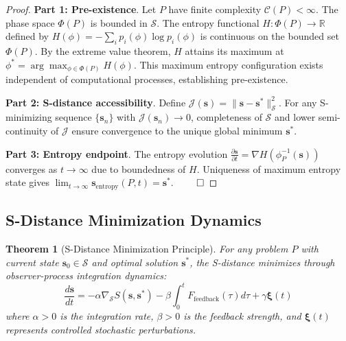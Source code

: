 \documentclass[11pt]{article}
\newtheorem{theorem}{Theorem}
\begin{document}
\begin{proof}
\textbf{Part 1: Pre-existence}. Let $P$ have finite complexity $\mathcal{C}(P) < \infty$. The phase space $\Phi(P)$ is bounded in $\mathcal{S}$. The entropy functional $H: \Phi(P) \to \mathbb{R}$ defined by $H(\phi) = -\sum_{i} p_i(\phi) \log p_i(\phi)$ is continuous on the bounded set $\Phi(P)$. By the extreme value theorem, $H$ attains its maximum at $\phi^* = \arg\max_{\phi \in \Phi(P)} H(\phi)$. This maximum entropy configuration exists independent of computational processes, establishing pre-existence.

\textbf{Part 2: S-distance accessibility}. Define $\mathcal{J}(\mathbf{s}) = \|\mathbf{s} - \mathbf{s}^*\|_{\mathcal{S}}^2$. For any S-minimizing sequence $\{\mathbf{s}_n\}$ with $\mathcal{J}(\mathbf{s}_n) \to 0$, completeness of $\mathcal{S}$ and lower semi-continuity of $\mathcal{J}$ ensure convergence to the unique global minimum $\mathbf{s}^*$.

\textbf{Part 3: Entropy endpoint}. The entropy evolution $\frac{\partial \mathbf{s}}{\partial t} = \nabla H(\phi_P^{-1}(\mathbf{s}))$ converges as $t \to \infty$ due to boundedness of $H$. Uniqueness of maximum entropy state gives $\lim_{t \to \infty} \mathbf{s}_{\text{entropy}}(P, t) = \mathbf{s}^*$. $\qed$
\end{proof}

\subsection{S-Distance Minimization Dynamics}

\begin{theorem}[S-Distance Minimization Principle]
\label{thm:s_minimization}
For any problem $P$ with current state $\mathbf{s}_0 \in \mathcal{S}$ and optimal solution $\mathbf{s}^*$, the S-distance minimizes through observer-process integration dynamics:
\begin{equation}
\frac{d\mathbf{s}}{dt} = -\alpha \nabla_{\mathcal{S}} S(\mathbf{s}, \mathbf{s}^*) - \beta \int_0^t F_{\text{feedback}}(\tau) d\tau + \gamma \mathbf{\xi}(t)
\label{eq:s_dynamics}
\end{equation}
where $\alpha > 0$ is the integration rate, $\beta > 0$ is the feedback strength, and $\mathbf{\xi}(t)$ represents controlled stochastic perturbations.
\end{theorem}
\end{document}
